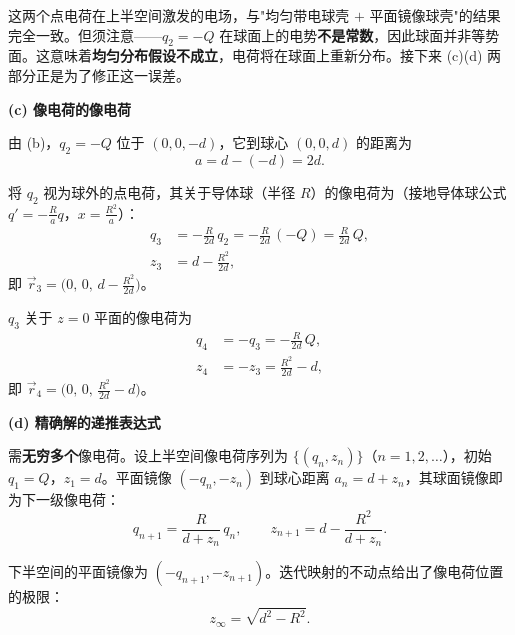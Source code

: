 \begin{solution}
    这两个点电荷在上半空间激发的电场，与"均匀带电球壳 $+$ 平面镜像球壳"的结果完全一致。但须注意——$q_2=-Q$ 在球面上的电势\textbf{不是常数}，因此球面并非等势面。这意味着\textbf{均匀分布假设不成立}，电荷将在球面上重新分布。接下来 (c)(d) 两部分正是为了修正这一误差。

    \medskip

    \textbf{(c) 像电荷的像电荷}

    由 (b)，$q_2 = -Q$ 位于 $(0,0,-d)$，它到球心 $(0,0,d)$ 的距离为
    \[
        a = d - (-d) = 2d.
    \]

    将 $q_2$ 视为球外的点电荷，其关于导体球（半径 $R$）的像电荷为（接地导体球公式 $q' = -\frac{R}{a}q$，$x = \frac{R^2}{a}$）：
    \[
        \begin{aligned}
            q_3 &= -\frac{R}{2d}\, q_2 = -\frac{R}{2d}\,(-Q) = \boxed{\frac{R}{2d}\,Q},\\[6pt]
            z_3 &= d - \frac{R^2}{2d},
        \end{aligned}
    \]
    即 $\vec{r}_3 = \bigl(0,\,0,\,d - \frac{R^2}{2d}\bigr)$。

    $q_3$ 关于 $z=0$ 平面的像电荷为
    \[
        \begin{aligned}
            q_4 &= -q_3 = \boxed{-\frac{R}{2d}\,Q},\\[6pt]
            z_4 &= -z_3 = \frac{R^2}{2d} - d,
        \end{aligned}
    \]
    即 $\vec{r}_4 = \bigl(0,\,0,\,\frac{R^2}{2d} - d\bigr)$。

    \medskip

    \textbf{(d) 精确解的递推表达式}

    需\textbf{无穷多个}像电荷。设上半空间像电荷序列为 $\{(q_n, z_n)\}$（$n = 1,2,\dots$），初始 $q_1 = Q$，$z_1 = d$。平面镜像 $(-q_n, -z_n)$ 到球心距离 $a_n = d + z_n$，其球面镜像即为下一级像电荷：
    \[
        \boxed{q_{n+1} = \frac{R}{d + z_n}\,q_n},
        \qquad
        \boxed{z_{n+1} = d - \frac{R^2}{d + z_n}}.
    \]

    下半空间的平面镜像为 $(-q_{n+1}, -z_{n+1})$。迭代映射的不动点给出了像电荷位置的极限：
    \[
        z_{\infty} = \sqrt{d^2 - R^2}.
    \]
\end{solution}
